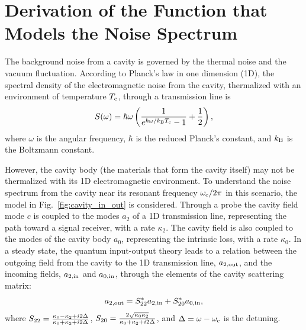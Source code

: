 \section{Derivation of the Function that Models the Noise Spectrum} 
\label{sec:cavitynoise}

The background noise from a cavity is governed by the thermal noise and the 
vacuum fluctuation. %
According to Planck's law in one dimension (1D), the spectral density of 
the electromagnetic noise from the cavity, thermalized with an environment of 
temperature $T_{\rm c}$, through a transmission line is 
\begin{equation}
\label{eq:cavity_thermal_spectral_density}
    S(\omega) = \hbar\omega \left( \frac{1}{e^{\hbar\omega/k_{\rm B}T_{\rm c}} - 1} +\frac{1}{2} \right),
\end{equation}
where $\omega$ is the angular frequency, $\hbar$ is the reduced Planck's 
constant, and $k_{\rm B}$ is the Boltzmann constant. 

However, the cavity body (the materials that form the cavity itself) may not 
be thermalized with its 1D electromagnetic environment. To understand the 
noise spectrum from the cavity near its 
resonant frequency $\omega_{\rm c}/2\pi$ in this scenario, the model in 
Fig.~\ref{fig:cavity_in_out} is considered. Through a probe the cavity field 
mode $c$ is coupled to the modes $a_2$ of a 1D transmission line, representing
 the path toward a signal receiver, with a rate $\kappa_2$. The cavity field 
is also coupled to the modes of the cavity body $a_0$, representing the 
intrinsic loss, with a rate $\kappa_0$. In a steady state, 
the quantum input-output theory leads to a relation between the outgoing field 
from the cavity to the 1D transmission line, $a_{\rm 2,out}$, and the incoming
 fields, $a_{\rm 2,in}$ and $a_{\rm 0,in}$, through the elements of the 
cavity scattering matrix:
\begin{equation} \label{eq:outgoing_field}
	 a_{\rm 2,out} = S^{*}_{\rm 22} a_{\rm 2,in} + S^{*}_{\rm 20} a_{\rm 0,in},
\end{equation}
where $S_{\rm 22} = \frac {\kappa_0 - \kappa_{\rm 2} + i 2 \Delta} {\kappa_0+\kappa_{\rm 2} + i 2 \Delta}$, $S_{\rm 20} = \frac {2\sqrt{\kappa_0 \kappa_{\rm 2}}} {\kappa_0+\kappa_{\rm 2} + i 2 \Delta}$,
and $\Delta = \omega-\omega_{\rm c}$ is the detuning. 

